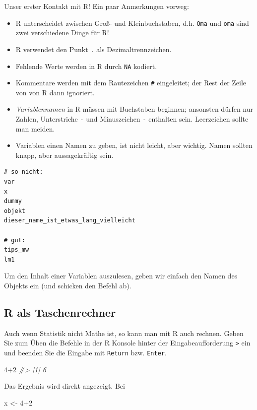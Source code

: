 \documentclass[12pt,ngerman,]{book}
\makeatletter
\newenvironment{Shaded}{\begin{snugshade}}{\end{snugshade}}
\newcommand{\DecValTok}[1]{\textcolor[rgb]{0.00,0.00,0.81}{{#1}}}
\newcommand{\StringTok}[1]{\textcolor[rgb]{0.31,0.60,0.02}{{#1}}}
\newcommand{\CommentTok}[1]{\textcolor[rgb]{0.56,0.35,0.01}{\textit{{#1}}}}
\newcommand{\NormalTok}[1]{{#1}}
\providecommand{\tightlist}{%
  \setlength{\itemsep}{0pt}\setlength{\parskip}{0pt}}
\newenvironment{kframe}{%
\medskip{}
\setlength{\fboxsep}{.8em}
 \def\at@end@of@kframe{}%
 \ifinner\ifhmode%
  \def\at@end@of@kframe{\end{minipage}}%
  \begin{minipage}{\columnwidth}%
 \fi\fi%
 \def\FrameCommand##1{\hskip\@totalleftmargin \hskip-\fboxsep
 \colorbox{shadecolor}{##1}\hskip-\fboxsep
     \hskip-\linewidth \hskip-\@totalleftmargin \hskip\columnwidth}%
 \MakeFramed {\advance\hsize-\width
   \@totalleftmargin\z@ \linewidth\hsize
   \@setminipage}}%
 {\par\unskip\endMakeFramed%
 \at@end@of@kframe}
\renewenvironment{Shaded}{\begin{kframe}}{\end{kframe}}
\theoremstyle{definition}
\theoremstyle{definition}
\theoremstyle{remark}
\makeatother
\begin{document}
Unser erster Kontakt mit R! Ein paar Anmerkungen vorweg:

\begin{itemize}
\tightlist
\item
  R unterscheidet zwischen Groß- und Kleinbuchstaben, d.h. \texttt{Oma}
  und \texttt{oma} sind zwei verschiedene Dinge für R!
\item
  R verwendet den Punkt \texttt{.} als Dezimaltrennzeichen.
\item
  Fehlende Werte werden in R durch \texttt{NA} kodiert.
\item
  Kommentare werden mit dem Rautezeichen \texttt{\#} eingeleitet; der
  Rest der Zeile von von R dann ignoriert.
\item
  \emph{Variablennamen} in R müssen mit Buchstaben
  beginnen; ansonsten dürfen nur Zahlen, Unterstriche \texttt{-} und
  Minuszeichen \texttt{-} enthalten sein. Leerzeichen sollte man meiden.
\item
  Variablen einen Namen zu geben, ist nicht leicht, aber wichtig. Namen
  sollten knapp, aber aussagekräftig sein.
\end{itemize}

\begin{verbatim}
# so nicht:
var
x
dummy
objekt
dieser_name_ist_etwas_lang_vielleicht

# gut:
tips_mw
lm1
\end{verbatim}

Um den Inhalt einer Variablen auszulesen, geben wir einfach den Namen
des Objekts ein (und schicken den Befehl ab).

\subsection{R als Taschenrechner}\label{r-als-taschenrechner}

Auch wenn Statistik nicht Mathe ist, so kann man mit R auch rechnen.
Geben Sie zum Üben die Befehle in der R Konsole hinter der
Eingabeaufforderung \texttt{\textgreater{}} ein und beenden Sie die
Eingabe mit \texttt{Return} bzw. \texttt{Enter}.

\begin{Shaded}
\begin{Highlighting}[]
\DecValTok{4+2} 
\CommentTok{#> [1] 6}
\end{Highlighting}
\end{Shaded}

Das Ergebnis wird direkt angezeigt. Bei

\begin{Shaded}
\begin{Highlighting}[]
\NormalTok{x <-}\StringTok{ }\DecValTok{4+2} 
\end{Highlighting}
\end{Shaded}
\end{document}
